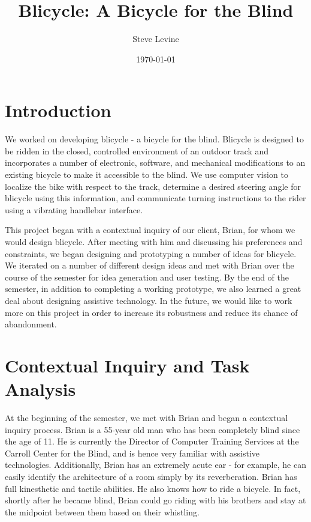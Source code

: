 \documentclass[aps,twocolumn,secnumarabic,balancelastpage,amsmath,amssymb,nofootinbib]{revtex4-1}
\begin{document}
\title{Blicycle: A Bicycle for the Blind}
\author{Steve Levine}
\date{\today}

\maketitle

\section{Introduction}
We worked on developing blicycle - a bicycle for the blind. Blicycle is designed to be ridden in the closed, controlled environment of an outdoor track and incorporates a number of electronic, software, and mechanical modifications to an existing bicycle to make it accessible to the blind. We use computer vision to localize the bike with respect to the track, determine a desired steering angle for blicycle using this information, and communicate turning instructions to the rider using a vibrating handlebar interface. 

This project began with a contextual inquiry of our client, Brian, for whom we would design blicycle. After meeting with him and discussing his preferences and constraints, we began designing and prototyping a number of ideas for blicycle. We iterated on a number of different design ideas and met with Brian over the course of the semester for idea generation and user testing. By the end of the semester, in addition to completing a working prototype, we also learned a great deal about designing assistive technology. In the future, we would like to work more on this project in order to increase its robustness and reduce its chance of abandonment. 

\section{Contextual Inquiry and Task Analysis}
At the beginning of the semester, we met with Brian and began a contextual inquiry process. Brian is a 55-year old man who has been completely blind since the age of 11. He is currently the Director of Computer Training Services at the Carroll Center for the Blind, and is hence very familiar with assistive technologies. Additionally, Brian has an extremely acute ear - for example, he can easily identify the architecture of a room simply by its reverberation. Brian has full kinesthetic and tactile abilities. He also knows how to ride a bicycle. In fact, shortly after he became blind, Brian could go riding with his brothers and stay at the midpoint between them based on their whistling.
\end{document}
